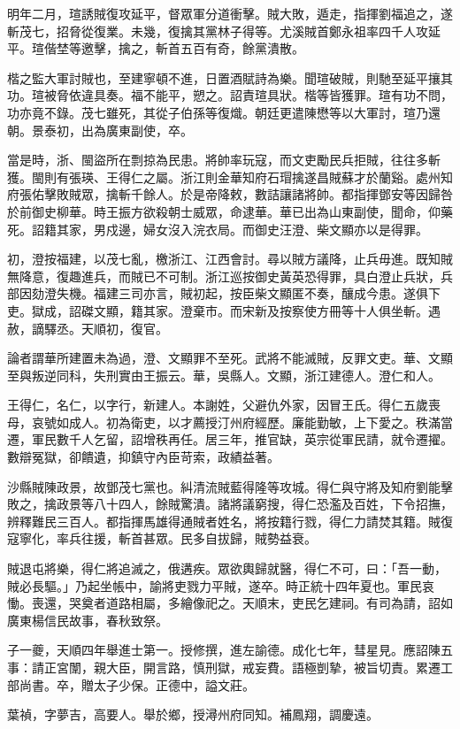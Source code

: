 \begin{pinyinscope}
明年二月，瑄誘賊復攻延平，督眾軍分道衝擊。賊大敗，遁走，指揮劉福追之，遂斬茂七，招脅從復業。未幾，復擒其黨林子得等。尤溪賊首鄭永祖率四千人攻延平。瑄偕埜等邀擊，擒之，斬首五百有奇，餘黨潰散。

楷之監大軍討賊也，至建寧頓不進，日置酒賦詩為樂。聞瑄破賊，則馳至延平攘其功。瑄被脅依違具奏。福不能平，愬之。詔責瑄具狀。楷等皆獲罪。瑄有功不問，功亦竟不錄。茂七雖死，其從子伯孫等復熾。朝廷更遣陳懋等以大軍討，瑄乃還朝。景泰初，出為廣東副使，卒。

當是時，浙、閩盜所在剽掠為民患。將帥率玩寇，而文吏勵民兵拒賊，往往多斬獲。閩則有張瑛、王得仁之屬。浙江則金華知府石瑁擒遂昌賊蘇才於蘭谿。處州知府張佑擊敗賊眾，擒斬千餘人。於是帝降敕，數詰讓諸將帥。都指揮鄧安等因歸咎於前御史柳華。時王振方欲殺朝士威眾，命逮華。華已出為山東副使，聞命，仰藥死。詔籍其家，男戍邊，婦女沒入浣衣局。而御史汪澄、柴文顯亦以是得罪。

初，澄按福建，以茂七亂，檄浙江、江西會討。尋以賊方議降，止兵毋進。既知賊無降意，復趣進兵，而賊已不可制。浙江巡按御史黃英恐得罪，具白澄止兵狀，兵部因劾澄失機。福建三司亦言，賊初起，按臣柴文顯匿不奏，釀成今患。遂俱下吏。獄成，詔磔文顯，籍其家。澄棄市。而宋新及按察使方冊等十人俱坐斬。遇赦，謫驛丞。天順初，復官。

論者謂華所建置未為過，澄、文顯罪不至死。武將不能滅賊，反罪文吏。華、文顯至與叛逆同科，失刑實由王振云。華，吳縣人。文顯，浙江建德人。澄仁和人。

王得仁，名仁，以字行，新建人。本謝姓，父避仇外家，因冒王氏。得仁五歲喪母，哀號如成人。初為衛吏，以才薦授汀州府經歷。廉能勤敏，上下愛之。秩滿當遷，軍民數千人乞留，詔增秩再任。居三年，推官缺，英宗從軍民請，就令遷擢。數辯冤獄，卻饋遺，抑鎮守內臣苛索，政績益著。

沙縣賊陳政景，故鄧茂七黨也。糾清流賊藍得隆等攻城。得仁與守將及知府劉能擊敗之，擒政景等八十四人，餘賊驚潰。諸將議窮搜，得仁恐濫及百姓，下令招撫，辨釋難民三百人。都指揮馬雄得通賊者姓名，將按籍行戮，得仁力請焚其籍。賊復寇寧化，率兵往援，斬首甚眾。民多自拔歸，賊勢益衰。

賊退屯將樂，得仁將追滅之，俄遘疾。眾欲輿歸就醫，得仁不可，曰：「吾一動，賊必長驅。」乃起坐帳中，諭將吏戮力平賊，遂卒。時正統十四年夏也。軍民哀慟。喪還，哭奠者道路相屬，多繪像祀之。天順末，吏民乞建祠。有司為請，詔如廣東楊信民故事，春秋致祭。

子一夔，天順四年舉進士第一。授修撰，進左諭德。成化七年，彗星見。應詔陳五事：請正宮闈，親大臣，開言路，慎刑獄，戒妄費。語極剴摯，被旨切責。累遷工部尚書。卒，贈太子少保。正德中，謚文莊。

葉禎，字夢吉，高要人。舉於鄉，授潯州府同知。補鳳翔，調慶遠。


\end{pinyinscope}
